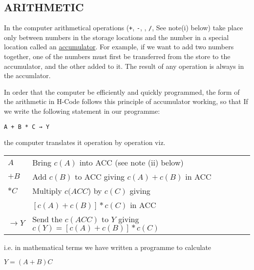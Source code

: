\documentclass[10pt, a4paper, oneside]{article}
\newcommand{\myuline}[1]{\uline{#1}}
\newcommand{\mytt}[1]{\texttt{\footnotesize #1}}
\begin{document}
\begin{multicols}{2}
\subsection{ARITHMETIC} \label{sec:ARITH}

In the computer arithmetical operations
(\mytt{+}, \mytt{-}, \mytt{*}, \mytt{/}, See note(i) below\footnotemark[1]) take place only between
numbers in the storage locations and the number in a
special location called an \myuline{accumulator}.  For example,
if we want to add two numbers together, one of the
numbers must first be transferred from the store to the
accumulator, and the other added to it.  The result of
any operation is always in the accumlator.


In order that the computer be efficiently and
quickly programmed, the form of the arithmetic in
H-Code follows this principle of accumulator working,
so that If we write the following statement in our
programme:

\begin{addmargin}[1cm]{1em}%
\begin{lstlisting}
A + B * C → Y
\end{lstlisting}
\end{addmargin}

the computer translates it operation by operation viz.

\begin{tabular}{lp{5cm}}
$A$  & Bring $c(A)$ into ACC (see note (ii) below\footnotemark[2]) \\
$+B$ & Add $c(B)$ to ACC giving $c(A)+c(B)$ in ACC \\
$*C$ & Multiply $c(ACC$) by $c(C)$ giving \\
     & $[c(A)+c(B)]*c(C)$ in ACC \\
$\rightarrow Y$ & Send the $c(ACC)$ to $Y$ giving $c(Y)=[c(A)+c(B)]*c(C)$
\end{tabular}


i.e. in mathematical terms we have written a programme
to calculate

\begin{math}
Y = (A+B)C
\end{math}


\end{multicols}
\end{document}
